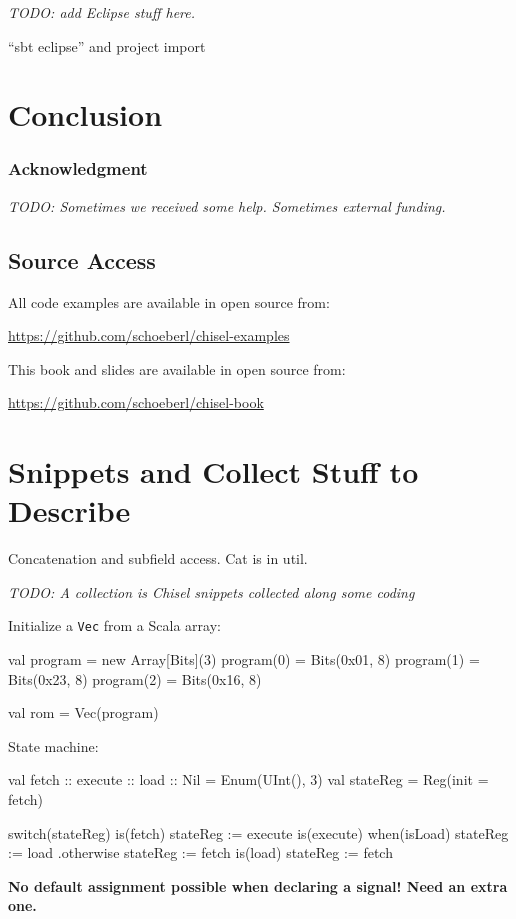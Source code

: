 \documentclass[%
    10pt, %
    headinclude, footexclude,
    openright, %
    notitlepage,
    cleardoubleempty,
    headsepline,
    pointlessnumbers,
    bibtotoc, idxtotoc,
    ]{scrbook}
\newcommand{\code}[1]{{\small{\texttt{#1}}}}
\newcommand{\todo}[1]{{\emph{TODO: #1}}}
\begin{document}
\todo{add Eclipse stuff here.}

``sbt eclipse'' and project import

\chapter{Conclusion}
\label{sec:conclusion}

\subsection*{Acknowledgment}

\todo{Sometimes we received some help. Sometimes external funding.}



\section*{Source Access}

All code examples are available in open source from:

\url{https://github.com/schoeberl/chisel-examples}

This book and slides are available in open source from:

\url{https://github.com/schoeberl/chisel-book}




\chapter*{Snippets and Collect Stuff to Describe}

Concatenation and subfield access. Cat is in util. 

\todo{A collection is Chisel snippets collected along some coding}

Initialize a \code{Vec} from a Scala array:
\begin{chisel}
  val program = new Array[Bits](3)
  program(0) = Bits(0x01, 8)
  program(1) = Bits(0x23, 8)
  program(2) = Bits(0x16, 8)
    
  val rom = Vec(program)
\end{chisel}

State machine:
\begin{chisel}
  val fetch :: execute :: load :: Nil = Enum(UInt(), 3)
  val stateReg = Reg(init = fetch)

  switch(stateReg) {
    is(fetch) {
      stateReg := execute
    }
    is(execute) {
      when(isLoad) {
        stateReg := load
      }.otherwise {
        stateReg := fetch
      }
    }
    is(load) {
      stateReg := fetch
    }
  }
\end{chisel}

\textbf{No default assignment possible when declaring a signal! Need an extra one.}
\end{document}
